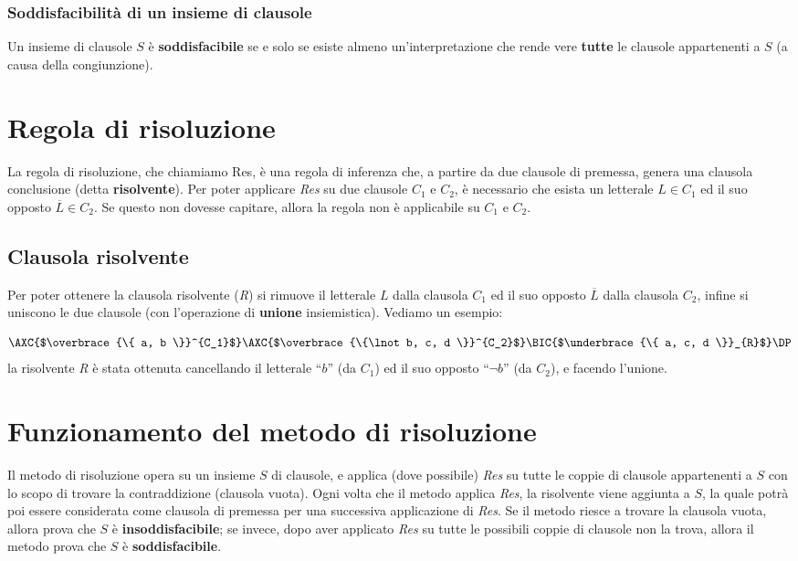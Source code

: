 \documentclass[a4paper,12pt]{report}
\begin{document}
\subsubsection{Soddisfacibilità di un insieme di clausole}
Un insieme di clausole $S$ è \textbf{soddisfacibile} se e solo se esiste almeno un'interpretazione che rende vere \textbf{tutte} le clausole appartenenti a $S$ (a causa della congiunzione).

\section{Regola di risoluzione}
La regola di risoluzione, che chiamiamo Res, è una regola di inferenza che, a partire da due clausole di premessa, genera una clausola conclusione (detta \textbf{risolvente}). Per poter applicare \emph{Res} su due clausole $C_1$ e $C_2$, è necessario che esista un letterale $L \in C_1$ ed il suo opposto $\overline{L} \in C_2$. Se questo non dovesse capitare, allora la regola non è applicabile su $C_1$ e $C_2$.

\subsection{Clausola risolvente}
Per poter ottenere la clausola risolvente (\emph{R}) si rimuove il letterale $L$ dalla clausola $C_1$ ed il suo opposto $\overline{L}$ dalla clausola $C_2$, infine si uniscono le due clausole (con l'operazione di \textbf{unione} insiemistica). Vediamo un esempio:

\[
    \AXC{$\overbrace{\{ a, b \}}^{C_1}$}
    \AXC{$\overbrace{\{\lnot b, c, d \}}^{C_2}$}
    \RightLabel{Res}
    \BIC{$\underbrace{\{ a, c, d \}}_{R}$}
    \DP
\]
la risolvente \emph{R} è stata ottenuta cancellando il letterale ``$b$'' (da $C_1$) ed il suo opposto ``$\lnot b$'' (da $C_2$), e facendo l'unione.

\section{Funzionamento del metodo di risoluzione}
Il metodo di risoluzione opera su un insieme $S$ di clausole, e applica (dove possibile) \emph{Res} su tutte le coppie di clausole appartenenti a $S$ con lo scopo di trovare la contraddizione (clausola vuota). Ogni volta che il metodo applica \emph{Res}, la risolvente viene aggiunta a $S$, la quale potrà poi essere considerata come clausola di premessa per una successiva applicazione di \emph{Res}. Se il metodo riesce a trovare la clausola vuota, allora prova che $S$ è \textbf{insoddisfacibile}; se invece, dopo aver applicato \emph{Res} su tutte le possibili coppie di clausole non la trova, allora il metodo prova che $S$ è \textbf{soddisfacibile}.
\end{document}

